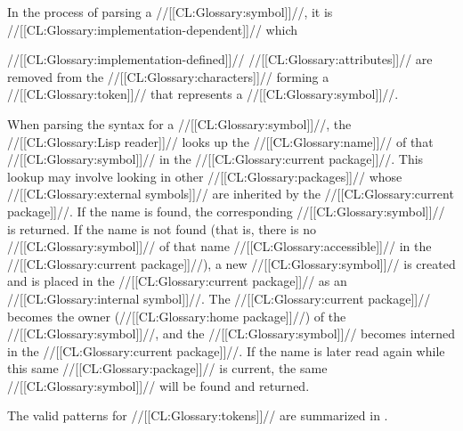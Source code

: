 In the process of parsing a //[[CL:Glossary:symbol]]//,
it is //[[CL:Glossary:implementation-dependent]]// which


//[[CL:Glossary:implementation-defined]]// //[[CL:Glossary:attributes]]// are removed
from the //[[CL:Glossary:characters]]// forming a //[[CL:Glossary:token]]// that represents a //[[CL:Glossary:symbol]]//.








When parsing the syntax for a //[[CL:Glossary:symbol]]//,
the //[[CL:Glossary:Lisp reader]]// looks up the //[[CL:Glossary:name]]// of that //[[CL:Glossary:symbol]]// 
in the //[[CL:Glossary:current package]]//.
This lookup may involve looking in other 
//[[CL:Glossary:packages]]// whose //[[CL:Glossary:external symbols]]//
are inherited by the //[[CL:Glossary:current package]]//.  If the name is found,
the corresponding //[[CL:Glossary:symbol]]// is returned.  If the name is not found
(that is, there is no //[[CL:Glossary:symbol]]// 
of that name //[[CL:Glossary:accessible]]// in the //[[CL:Glossary:current package]]//),
a new //[[CL:Glossary:symbol]]// is created and is placed in the //[[CL:Glossary:current package]]//
as an //[[CL:Glossary:internal symbol]]//.  The //[[CL:Glossary:current package]]// becomes the owner
(//[[CL:Glossary:home package]]//) of the //[[CL:Glossary:symbol]]//, 
and the //[[CL:Glossary:symbol]]// becomes interned in the //[[CL:Glossary:current package]]//.
If the name is later read again while this same //[[CL:Glossary:package]]// is
current, the same //[[CL:Glossary:symbol]]// will be found and returned.

\endsubSection%


The valid patterns for //[[CL:Glossary:tokens]]// are summarized in \thenextfigure. 


